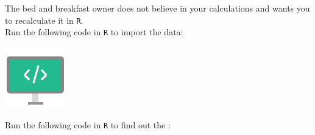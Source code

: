 \begin{minipage}{0.8\textwidth}
The bed and breakfast owner does not believe in your calculations and wants you to recalculate it in \texttt{R}. \\

Run the following code in \texttt{R} to import the data: \\
\end{minipage}%
\hfill%
\begin{minipage}{0.1\textwidth}
\includegraphics[width=\linewidth]{Files/Images/displaycode.pdf}
\end{minipage}
\vspace*{.1cm}



\rcodeanswertiny


Run the following code in \texttt{R} to find out the : \\

